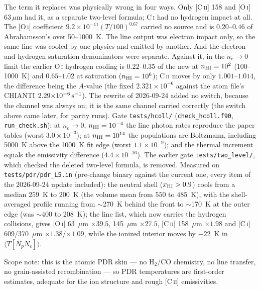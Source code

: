 \documentclass[english,a4paper]{my_memo}
\newcommand{\code}[1]{\texttt{#1}}
\begin{document}
The term it replaces was physically wrong in four ways.  Only
[C\,\textsc{ii}] 158 and [O\,\textsc{i}] 63\,$\mu$m had it, as a separate
two-level formula; C\,\textsc{i} had no hydrogen impact at all.  The
[O\,\textsc{i}] coefficient $9.2{\times}10^{-11}(T/100)^{0.67}$ carried no
source and is $0.20$--$0.46$ of Abrahamsson's over 50--1000~K.  The line
output was electron impact only, so the same line was cooled by one
physics and emitted by another.  And the electron and hydrogen saturation
denominators were separate.  Against it, in the $n_e \to 0$ limit the
earlier O\,\textsc{i} hydrogen cooling is $0.22$--$0.35$ of the new at
$n_{\rm HI} = 10^2$ (100--1000~K) and $0.65$--$1.02$ at saturation
($n_{\rm HI} = 10^6$); C\,\textsc{ii} moves by only $1.001$--$1.014$, the
difference being the $A$-value (the fixed $2.321{\times}10^{-6}$ against the
atom file's CHIANTI $2.29{\times}10^{-6}\,{\rm s^{-1}}$).  The rewrite of
2026-09-24 added no switch, because the channel was always on; it is the
same channel carried correctly (the switch above came later, for parity
runs).  Gate \code{tests/hcoll/} (\code{check\_hcoll.f90},
\code{run\_check.sh}): at $n_e \to 0$, $n_{\rm HI} = 10^{-4}$ the line photon
rates reproduce the paper tables (worst $3.0{\times}10^{-3}$); at
$n_{\rm HI} = 10^{14}$ the populations are Boltzmann, including 5000~K
above the 1000~K fit edge (worst $1.1{\times}10^{-9}$); and the thermal
increment equals the emissivity difference ($4.4{\times}10^{-16}$).  The
earlier gate \code{tests/two\_level/}, which checked the deleted two-level
formula, is removed.  Measured on \code{tests/pdr/pdr\_L5.in} (pre-change binary against the
current one, every item of the 2026-09-24 update included): the neutral
shell ($x_{\rm HI}>0.9$) cools from a median $259$~K to $200$~K (the
volume mean from $550$ to $485$~K), with the shell-averaged profile
running from $\sim$270~K behind the front to $\sim$170~K at the outer
edge (was $\sim$400 to 208~K); the line list, which now carries the
hydrogen collisions, gives [O\,\textsc{i}] 63~$\mu$m $\times39.5$,
145~$\mu$m $\times27.5$, [C\,\textsc{ii}] 158~$\mu$m $\times1.98$ and
[C\,\textsc{i}] 609/370~$\mu$m $\times1.38$/$\times1.09$, while the ionized
interior moves by $-22$~K in $\langle T[N_pN_e]\rangle$.

Scope note: this is the atomic PDR skin --- no H$_2$/CO chemistry, no
line transfer, no grain-assisted recombination --- so PDR
temperatures are first-order estimates, adequate for the ion structure
and rough [C\,\textsc{ii}] emissivities.
\end{document}
